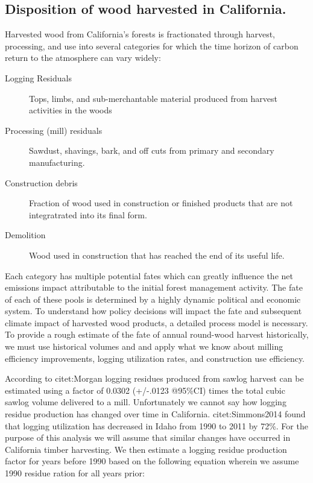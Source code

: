 \documentclass[a4paper]{article}
\begin{document}
\subsection{Disposition of wood harvested in California.}
\label{sec-3-1}

Harvested wood from California's forests is fractionated through harvest, processing, and use into several categories for which the time horizon of carbon return to the atmosphere can vary widely:

\begin{description}
\item[{Logging Residuals}] Tops, limbs, and sub-merchantable material produced from harvest activities in the woods
\item[{Processing (mill) residuals}] Sawdust, shavings, bark, and off cuts from primary and secondary manufacturing.
\item[{Construction debris}] Fraction of wood used in construction or  finished products that are not integratrated into its final form.
\item[{Demolition}] Wood used in construction that has reached the end of its useful life.
\end{description}

Each category has multiple potential fates which can greatly influence the net emissions impact attributable to the initial forest management activity.  The fate of each of these pools is determined by a highly dynamic political and economic system. To understand how policy decisions will impact the fate and subsequent climate impact of harvested wood products, a detailed process model is necessary. To provide a rough estimate of the fate of annual round-wood harvest historically, we must use historical volumes and and apply what we know about milling efficiency improvements, logging utilization rates, and construction use efficiency. 

According to citet:Morgan logging residues produced from sawlog harvest can be estimated using a factor of 0.0302 (+/-.0123 @95\%CI) times the total cubic sawlog volume delivered to a mill. Unfortunately we cannot say how logging residue production has changed over time in California.  citet:Simmons2014 found that logging utilization has decreased in Idaho from 1990 to 2011 by 72\%. For the purpose of this analysis we will assume that similar changes have occurred in California timber harvesting. We then estimate a logging residue production factor for years before 1990 based on the following equation wherein we assume 1990 residue ration for all years prior:
\end{document}
